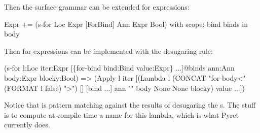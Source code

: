 Then the surface grammar can be extended for  expressions:
\begin{Codes}
Expr += (s-for Loc Expr [ForBind] Ann Expr Bool)
with scope:
  bind binds in body
\end{Codes}

Then for-expressions can be implemented with the desugaring rule:
\begin{Codes}
   (s-for l:Loc
          iter:Expr
          [\{for-bind bind:Bind value:Expr\} ...]@binds
          ann:Ann
          body:Expr
          blocky:Bool)
=> (Apply l iter
     [(Lambda l (CONCAT "for-body<" (FORMAT l false) ">")
        [] [bind ...] ann "" body None None blocky)
      value ...])
\end{Codes}

Notice that  is pattern matching against the results of
desugaring the s. The  stuff is to
compute at compile time a name for this lambda, which is what Pyret
currently does.

\newcommand{\C}{\(\sb{c}\)}
